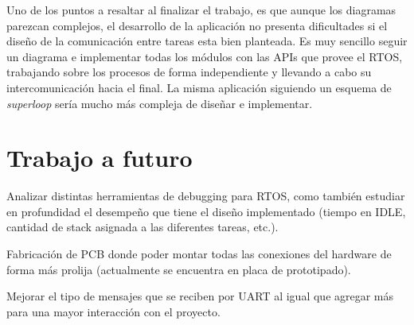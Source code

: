 \documentclass{IEEEtran}
\begin{document}
Uno de los puntos a resaltar al finalizar el trabajo, es que aunque los diagramas parezcan complejos, el desarrollo de la aplicación no presenta dificultades si el diseño de la comunicación entre tareas esta bien planteada. Es muy sencillo seguir un diagrama e implementar todas los módulos con las APIs que provee el RTOS, trabajando sobre los procesos de forma independiente y llevando a cabo su intercomunicación hacia el final. La misma aplicación siguiendo un esquema de \textit{superloop} sería mucho más compleja de diseñar e implementar.

\section{Trabajo a futuro}
Analizar distintas herramientas de debugging para RTOS, como también estudiar en profundidad el desempeño que tiene el diseño implementado (tiempo en IDLE, cantidad de stack asignada a las diferentes tareas, etc.).

Fabricación de PCB donde poder montar todas las conexiones del hardware de forma más prolija (actualmente se encuentra en placa de prototipado).

Mejorar el tipo de mensajes que se reciben por UART al igual que agregar más para una mayor interacción con el proyecto.

\printbibliography
\end{document}
